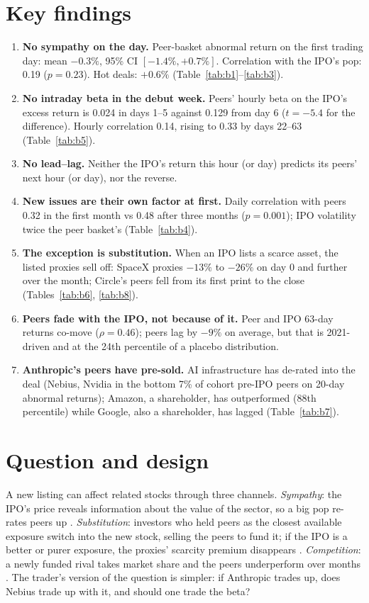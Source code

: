 \documentclass[11pt]{article}
\begin{document}
\section*{Key findings}
\begin{enumerate}[leftmargin=1.4em]
\item \textbf{No sympathy on the day.} Peer-basket abnormal return on the first trading day: mean $-0.3\%$, 95\% CI $[-1.4\%, +0.7\%]$. Correlation with the IPO's pop: 0.19 ($p=0.23$). Hot deals: $+0.6\%$ (Table~\ref{tab:b1}--\ref{tab:b3}).
\item \textbf{No intraday beta in the debut week.} Peers' hourly beta on the IPO's excess return is 0.024 in days 1--5 against 0.129 from day 6 ($t=-5.4$ for the difference). Hourly correlation 0.14, rising to 0.33 by days 22--63 (Table~\ref{tab:b5}).
\item \textbf{No lead--lag.} Neither the IPO's return this hour (or day) predicts its peers' next hour (or day), nor the reverse.
\item \textbf{New issues are their own factor at first.} Daily correlation with peers 0.32 in the first month vs 0.48 after three months ($p=0.001$); IPO volatility twice the peer basket's (Table~\ref{tab:b4}).
\item \textbf{The exception is substitution.} When an IPO lists a scarce asset, the listed proxies sell off: SpaceX proxies $-13\%$ to $-26\%$ on day 0 and further over the month; Circle's peers fell from its first print to the close (Tables~\ref{tab:b6}, \ref{tab:b8}).
\item \textbf{Peers fade with the IPO, not because of it.} Peer and IPO 63-day returns co-move ($\rho=0.46$); peers lag by $-9\%$ on average, but that is 2021-driven and at the 24th percentile of a placebo distribution.
\item \textbf{Anthropic's peers have pre-sold.} AI infrastructure has de-rated into the deal (Nebius, Nvidia in the bottom 7\% of cohort pre-IPO peers on 20-day abnormal returns); Amazon, a shareholder, has outperformed (88th percentile) while Google, also a shareholder, has lagged (Table~\ref{tab:b7}).
\end{enumerate}

\section{Question and design}
A new listing can affect related stocks through three channels. \textit{Sympathy}: the IPO's price reveals information about the value of the sector, so a big pop re-rates peers up \citep{slovin1994}. \textit{Substitution}: investors who held peers as the closest available exposure switch into the new stock, selling the peers to fund it; if the IPO is a better or purer exposure, the proxies' scarcity premium disappears \citep{braun2016}. \textit{Competition}: a newly funded rival takes market share and the peers underperform over months \citep{hsu2010}. The trader's version of the question is simpler: if Anthropic trades up, does Nebius trade up with it, and should one trade the beta?
\end{document}
